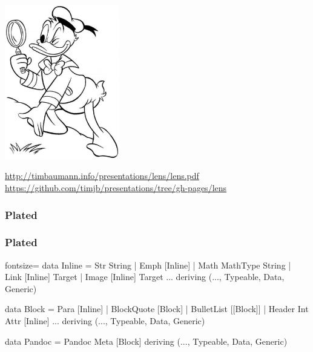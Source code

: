 \documentclass{beamer}
\begin{document}
{
\begin{frame}[b]
  \begin{center}
    \includegraphics[width=5cm,keepaspectratio]{images/donald-detective.jpg} \\
  \end{center}

  \centering \small
  \url{http://timbaumann.info/presentations/lens/lens.pdf} \\
  \url{https://github.com/timjb/presentations/tree/gh-pages/lens}
\end{frame}}

\begin{frame}[fragile]
  \frametitle{Plated}
\end{frame}

\begin{frame}[fragile]
  \frametitle{Plated}
  \begin{haskellcode*}{fontsize=\small}
data Inline
  = Str String
  | Emph [Inline]
  | Math MathType String
  | Link [Inline] Target
  | Image [Inline] Target
    ...
  deriving (..., Typeable, Data, Generic)

data Block
  = Para [Inline]
  | BlockQuote [Block]
  | BulletList [[Block]]
  | Header Int Attr [Inline]
    ...
  deriving (..., Typeable, Data, Generic)

data Pandoc = Pandoc Meta [Block]
  deriving (..., Typeable, Data, Generic)
  \end{haskellcode*}
\end{frame}



\end{document}
